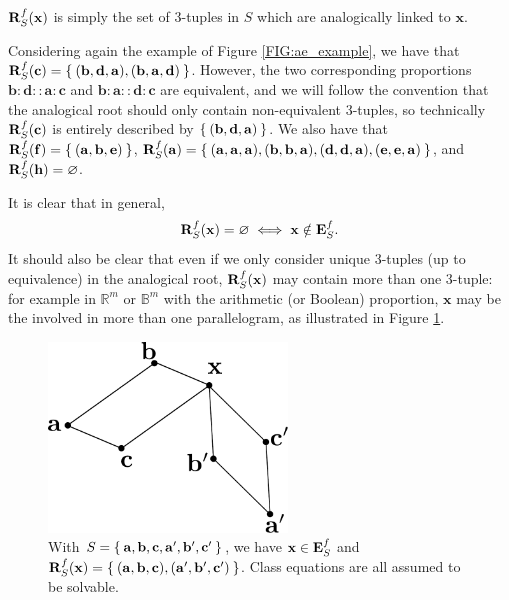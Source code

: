 \noindent
$\mathbf{R}_{S}^{f}(\mathbf{x})$ is simply the set of 3-tuples in $S$ which are analogically linked to
$\mathbf{x}$.

\begin{testexample}
Considering again the example of Figure \ref{FIG:ae_example}, we have that
$\mathbf{R}_{S}^{f}(\mathbf{c}) = \Set{(\mathbf{b}, \mathbf{d},\mathbf{a}),
(\mathbf{b}, \mathbf{a},\mathbf{d})}$. However, the two corresponding
proportions $\mathbf{b}: \mathbf{d}::\mathbf{a}:\mathbf{c}$ and $\mathbf{b}:
\mathbf{a}::\mathbf{d}:\mathbf{c}$ are equivalent, and we will follow the
convention that the analogical root should only contain non-equivalent
3-tuples, so technically $\mathbf{R}_{S}^{f}(\mathbf{c})$ is entirely described by
$\Set{(\mathbf{b}, \mathbf{d},\mathbf{a})}$.  We also have that
$\mathbf{R}_{S}^{f}(\mathbf{f}) = \Set{(\mathbf{a}, \mathbf{b},
\mathbf{e})}$, $\mathbf{R}_{S}^{f}(\mathbf{a}) = \Set{(\mathbf{a}, \mathbf{a},
\mathbf{a}), (\mathbf{b}, \mathbf{b}, \mathbf{a}), (\mathbf{d}, \mathbf{d},
\mathbf{a}), (\mathbf{e}, \mathbf{e}, \mathbf{a})}$, and
$\mathbf{R}_{S}^{f}(\mathbf{h}) = \varnothing$. \end{testexample}

It is clear that in general, $$\mathbf{R}_{S}^{f}(\mathbf{x}) = \varnothing\iff \mathbf{x} \notin
\mathbf{E}_{S}^{f}.$$ It should also be clear that even if we only consider unique 3-tuples
(up to equivalence) in the analogical root, $\mathbf{R}_{S}^{f}(\mathbf{x})$ may contain more than one
3-tuple: for example in $\mathbb{R}^m$ or $\mathbb{B}^m$ with the arithmetic
(or Boolean) proportion, $\mathbf{x}$ may be the involved in more than one
parallelogram, as illustrated in Figure \ref{FIG:multiple_parallelograms}.

\begin{figure}[!h]
\centering
  \includegraphics[width=2.5in]{figures/multiple_parallelograms.pdf}
  \caption{With $S = \Set{\mathbf{a}, \mathbf{b}, \mathbf{c}, \mathbf{a}',
  \mathbf{b}', \mathbf{c}'}$, we have $\mathbf{x} \in \mathbf{E}_{S}^{f}$ and $\mathbf{R}_{S}^{f}(\mathbf{x}) =
  \Set{(\mathbf{a}, \mathbf{b}, \mathbf{c}), (\mathbf{a}', \mathbf{b}',
  \mathbf{c}')}$. Class equations are all assumed to be solvable.}
\label{FIG:multiple_parallelograms}
\end{figure}

